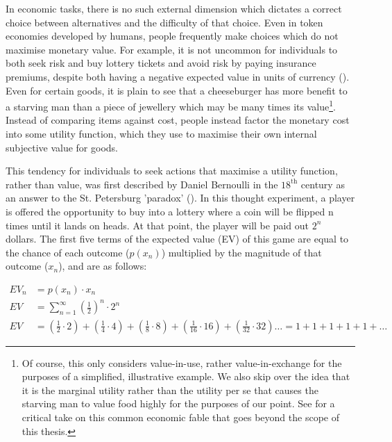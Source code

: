 In economic tasks, there is no such external dimension which dictates a correct choice between alternatives and the difficulty of that choice. Even in token economies developed by humans, people frequently make choices which do not maximise monetary value. For example, it is not uncommon for individuals to both seek risk and buy lottery tickets and avoid risk by paying insurance premiums, despite both having a negative expected value in units of currency (\cite{friedmanUtilityAnalysisChoices1948}). Even for certain goods, it is plain to see that a cheeseburger has more benefit to a starving man than a piece of jewellery which may be many times its value\footnote{Of course, this only considers value-in-use, rather value-in-exchange for the purposes of a simplified, illustrative example. We also skip over the idea that it is the marginal utility rather than the utility per se that causes the starving man to value food highly for the purposes of our point. See \cite{whiteDoctoringAdamSmith2002} for a critical take on this common economic fable that goes beyond the scope of this thesis.}. Instead of comparing items against cost, people instead factor the monetary cost into some utility function, which they use to maximise their own internal subjective value for goods.

This tendency for individuals to seek actions that maximise a utility function, rather than value, was first described by Daniel Bernoulli in the $18^{\text{th}}$ century as an answer to the St. Petersburg 'paradox' (\cite{bernoulliExpositionNewTheory1954}). In this thought experiment, a player is offered the opportunity to buy into a lottery where a coin will be flipped n times until it lands on heads. At that point, the player will be paid out $2^{n}$ dollars. The first five terms of the expected value (EV) of this game are equal to the chance of each outcome ($p(x_{n})$) multiplied by the magnitude of that outcome ($x_{n}$), and are as follows:

\begin{equation}
\begin{aligned}
EV_n &= p(x_n) \cdot x_n \\
EV &= \sum_{n=1}^{\infty} \left(\frac{1}{2}\right)^n \cdot 2^n \\
EV &= \left(\frac{1}{2} \cdot 2\right) + \left(\frac{1}{4} \cdot 4\right) + \left(\frac{1}{8} \cdot 8\right) + \left(\frac{1}{16} \cdot 16\right) + \left(\frac{1}{32} \cdot 32\right) \ldots = 1 + 1 + 1 + 1 + 1 + \ldots
\label{eq:st_petersburg}
\end{aligned}
\end{equation}

